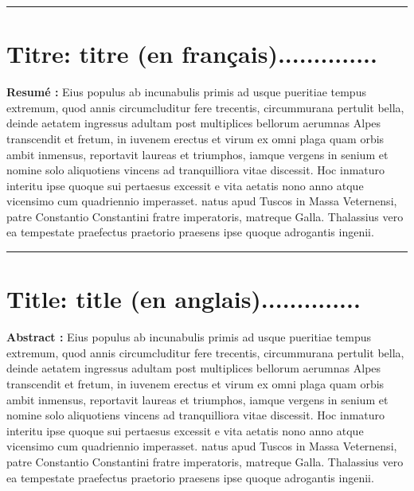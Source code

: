 \par\nobreak
\hspace{- 1.75cm}\noindent \textcolor{mathSTIC-Color}{\rule{\textwidth }{0.2cm}}  %
\section*{\textcolor{mathSTIC-Color}{Titre}: titre (en fran\c cais)..............}
\noindent {}

  
\begin{multicols}{2}
\noindent \textbf{Resum\'{e} : }Eius populus ab incunabulis primis ad usque pueritiae tempus extremum, quod annis circumcluditur fere trecentis, circummurana pertulit bella, deinde aetatem ingressus adultam post multiplices bellorum aerumnas Alpes transcendit et fretum, in iuvenem erectus et virum ex omni plaga quam orbis ambit inmensus, reportavit laureas et triumphos, iamque vergens in senium et nomine solo aliquotiens vincens ad tranquilliora vitae discessit.
Hoc inmaturo interitu ipse quoque sui pertaesus excessit e vita aetatis nono anno atque vicensimo cum quadriennio imperasset. natus apud Tuscos in Massa Veternensi, patre Constantio Constantini fratre imperatoris, matreque Galla.
Thalassius vero ea tempestate praefectus praetorio praesens ipse quoque adrogantis ingenii. 




\end{multicols}
\hspace{- 1.75cm}\noindent \textcolor{mathSTIC-Color}{\rule{\linewidth}{0.2cm}}
\section*{\textcolor{mathSTIC-Color}{Title}: title (en anglais)..............}
\noindent {}

\begin{multicols}{2}
\noindent \textbf{Abstract : }Eius populus ab incunabulis primis ad usque pueritiae tempus extremum, quod annis circumcluditur fere trecentis, circummurana pertulit bella, deinde aetatem ingressus adultam post multiplices bellorum aerumnas Alpes transcendit et fretum, in iuvenem erectus et virum ex omni plaga quam orbis ambit inmensus, reportavit laureas et triumphos, iamque vergens in senium et nomine solo aliquotiens vincens ad tranquilliora vitae discessit.
Hoc inmaturo interitu ipse quoque sui pertaesus excessit e vita aetatis nono anno atque vicensimo cum quadriennio imperasset. natus apud Tuscos in Massa Veternensi, patre Constantio Constantini fratre imperatoris, matreque Galla.	Thalassius vero ea tempestate praefectus praetorio praesens ipse quoque adrogantis ingenii.
\end{multicols}
